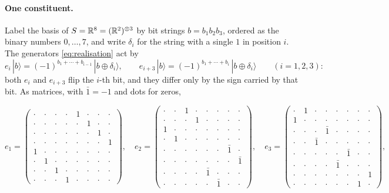 \paragraph{One constituent.} Label the basis of $S=\mathbb{R}^8=(\mathbb{R}^2)^{\otimes3}$ by bit strings $b=b_1b_2b_3$, ordered as the binary numbers $0,\dots,7$, and write $\delta_i$ for
the string with a single $1$ in position $i$. The generators \eqref{eq:realisation} act by
\[
e_i\,|b\rangle=(-1)^{b_1+\cdots+b_{i-1}}\,|b\oplus\delta_i\rangle,\qquad e_{i+3}\,|b\rangle=(-1)^{b_1+\cdots+b_i}\,|b\oplus\delta_i\rangle\qquad(i=1,2,3):
\]
both $e_i$ and $e_{i+3}$ flip the $i$-th bit, and they differ only by the sign carried by that bit. As matrices, with $\bar1=-1$ and dots for zeros,
\begin{center}
\scriptsize
\setlength{\arraycolsep}{2.2pt}
\[e_1=\begin{pmatrix}\cdot&\cdot&\cdot&\cdot&1&\cdot&\cdot&\cdot\\\cdot&\cdot&\cdot&\cdot&\cdot&1&\cdot&\cdot\\\cdot&\cdot&\cdot&\cdot&\cdot&\cdot&1&\cdot\\\cdot&\cdot&\cdot&\cdot&\cdot&\cdot&\cdot&1\\1&\cdot&\cdot&\cdot&\cdot&\cdot&\cdot&\cdot\\\cdot&1&\cdot&\cdot&\cdot&\cdot&\cdot&\cdot\\\cdot&\cdot&1&\cdot&\cdot&\cdot&\cdot&\cdot\\\cdot&\cdot&\cdot&1&\cdot&\cdot&\cdot&\cdot\end{pmatrix},\quad e_2=\begin{pmatrix}\cdot&\cdot&1&\cdot&\cdot&\cdot&\cdot&\cdot\\\cdot&\cdot&\cdot&1&\cdot&\cdot&\cdot&\cdot\\1&\cdot&\cdot&\cdot&\cdot&\cdot&\cdot&\cdot\\\cdot&1&\cdot&\cdot&\cdot&\cdot&\cdot&\cdot\\\cdot&\cdot&\cdot&\cdot&\cdot&\cdot&\bar1&\cdot\\\cdot&\cdot&\cdot&\cdot&\cdot&\cdot&\cdot&\bar1\\\cdot&\cdot&\cdot&\cdot&\bar1&\cdot&\cdot&\cdot\\\cdot&\cdot&\cdot&\cdot&\cdot&\bar1&\cdot&\cdot\end{pmatrix},\quad e_3=\begin{pmatrix}\cdot&1&\cdot&\cdot&\cdot&\cdot&\cdot&\cdot\\1&\cdot&\cdot&\cdot&\cdot&\cdot&\cdot&\cdot\\\cdot&\cdot&\cdot&\bar1&\cdot&\cdot&\cdot&\cdot\\\cdot&\cdot&\bar1&\cdot&\cdot&\cdot&\cdot&\cdot\\\cdot&\cdot&\cdot&\cdot&\cdot&\bar1&\cdot&\cdot\\\cdot&\cdot&\cdot&\cdot&\bar1&\cdot&\cdot&\cdot\\\cdot&\cdot&\cdot&\cdot&\cdot&\cdot&\cdot&1\\\cdot&\cdot&\cdot&\cdot&\cdot&\cdot&1&\cdot\end{pmatrix},\]

\end{center}
